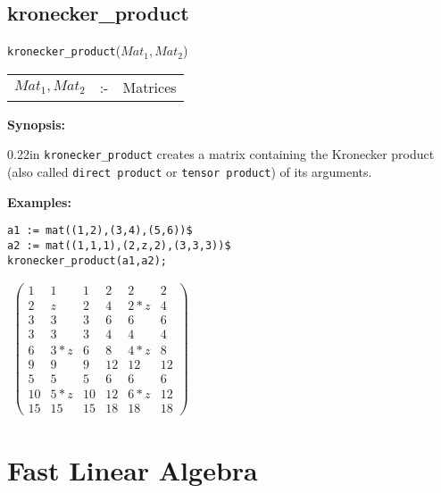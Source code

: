 \subsection{kronecker\_product}

\hspace*{0.175in} {\tt kronecker\_product}($Mat_1,Mat_2$)

\hspace*{0.1in}
\begin{tabular}{l l l}
$Mat_1,Mat_2$ &:-& Matrices
\end{tabular}

{\bf Synopsis:} 

\begin{addtolength}{\leftskip}{0.22in}
{\tt kronecker\_product} creates a matrix containing the Kronecker product 
(also called {\tt direct product} or {\tt tensor product}) of its arguments.

\end{addtolength}

{\bf Examples:}
\begin{verbatim}
a1 := mat((1,2),(3,4),(5,6))$
a2 := mat((1,1,1),(2,z,2),(3,3,3))$
kronecker_product(a1,a2);
\end{verbatim}
\begin{flushleft}
\hspace*{0.1in}
\begin{math}
\begin{array}{ccc}
\left( \begin{array}{cccccc} 1 & 1 & 1 & 2 & 2 & 2 \\
2 &  z & 2 & 4  &2*z &4 \\
3 &  3 & 3 & 6  & 6  &6 \\
3 &  3 & 3 & 4  & 4  &4 \\
6 & 3*z& 6 & 8  &4*z &8 \\
9 &  9 & 9 & 12 &12  &12\\
5 &  5 & 5 & 6  & 6  &6 \\
10 &5*z& 10& 12 &6*z &12 \\ 
15 &15 & 15& 18 &18  &18 \end{array} \right)
\end{array}
\end{math}
\end{flushleft}

\section{Fast Linear Algebra}

